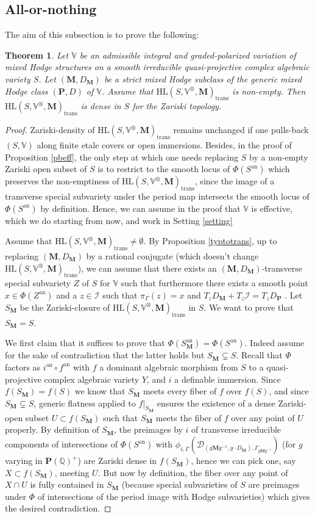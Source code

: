 \documentclass[10pt]{article}
\numberwithin{equation}{subsection}
\theoremstyle{plain}
\newtheorem{theorem}{Theorem}[section]
\theoremstyle{definition}
\theoremstyle{remark}
\newcommand{\I}{\mathscr{I}}
\newcommand{\Q}{\mathbb Q}
\newcommand{\V}{\mathbb V}
\newcommand{\pp}{\mathbf P}
\newcommand{\M}{\mathbf M}
\newcommand{\HLM}{\mathrm{HL}(S, \V^\otimes, \M)}
\newcommand{\an}{\mathrm{an}}
\newcommand{\period}{\mathscr{D}}
\newcommand{\trans}{\mathrm{trans}}
\begin{document}
\subsection{All-or-nothing}
The aim of this subsection is to prove the following:
\begin{theorem}\label{allornothing}
Let $\V$ be an admissible integral and graded-polarized variation of mixed Hodge structures on a smooth irreducible quasi-projective complex algebraic variety $S$. Let $(\M,D_\M)$ be a strict mixed Hodge subclass of the generic mixed Hodge class $(\pp,D)$ of $\V$. Assume that $\HLM_\trans$ is non-empty. Then $\HLM_\trans$ is dense in $S$ for the Zariski topology.
\end{theorem}
\begin{proof}
Zariski-density of $\HLM_\trans$ remains unchanged if one pulls-back $(S,\V)$ along finite etale covers or open immersions. Besides, in the proof of Proposition \ref{pbeff}, the only step at which one needs replacing $S$ by a non-empty Zariski open subset of $S$ is to restrict to the smooth locus of $\Phi(S^\an)$ which preserves the non-emptiness of $\HLM_\trans$, since the image of a transverse special subvariety under the period map intersects the smooth locus of $\Phi(S^\an)$ by definition. Hence, we can assume in the proof that $\V$ is effective, which we do starting from now, and work in Setting \ref{setting}

Assume that $\HLM_\trans \neq \emptyset$. By Proposition \ref{typtotrans}, up to replacing $(\M,D_\M)$ by a rational conjugate (which doesn't change $\HLM_\trans$), we can assume that there exists an $(\M,D_\M)$-transverse special subvariety $Z$ of $S$ for $\V$ such that furthermore there exists a smooth point $x \in \Phi(Z^\an)$ and a $z \in \I$ such that $\pi_\Gamma(z) = x$ and $T_z D_\M + T_z \I = T_z D_\pp$ . Let $S_\M$ be the Zariski-closure of $\HLM_\trans$ in $S$. We want to prove that $S_\M = S$. 

We first claim that it suffices to prove that $\Phi(S_\M^\an) = \Phi(S^\an)$. Indeed assume for the sake of contradiction that the latter holds but $S_\M \subsetneq S$. Recall that $\Phi$ factors as $i^\an \circ f^\an$ with $f$ a dominant algebraic morphism from $S$ to a quasi-projective complex algebraic variety $Y$, and $i$ a definable immersion. Since $f(S_\M) = f(S)$ we know that $S_\M$ meets every fiber of $f$ over $f(S)$, and since $S_\M \subsetneq S$, generic flatness applied to $f \vert_{S_\M}$ ensures the existence of a dense Zariski-open subset $U \subset f(S_\M)$ such that $S_\M$ meets the fiber of $f$ over any point of $U$ properly. By definition of $S_\M$, the preimages by $i$ of transverse irreducible components of intersections of $\Phi(S^\an)$ with $\phi_{i, \Gamma}(\period_{(g\M g^{-1},g \cdot D_\M), \Gamma_{g\M g^{-1}}})$ (for $g$ varying in $\pp(\Q)^+$) are Zariski dense in $f(S_\M)$, hence we can pick one, say $X \subset f(S_\M)$, meeting $U$. But now by definition, the fiber over any point of $X \cap U$ is fully contained in $S_\M$ (because special subvarieties of $S$ are preimages under $\Phi$ of intersections of the period image with Hodge subvarieties) which gives the desired contradiction.


\end{proof}
\end{document}
